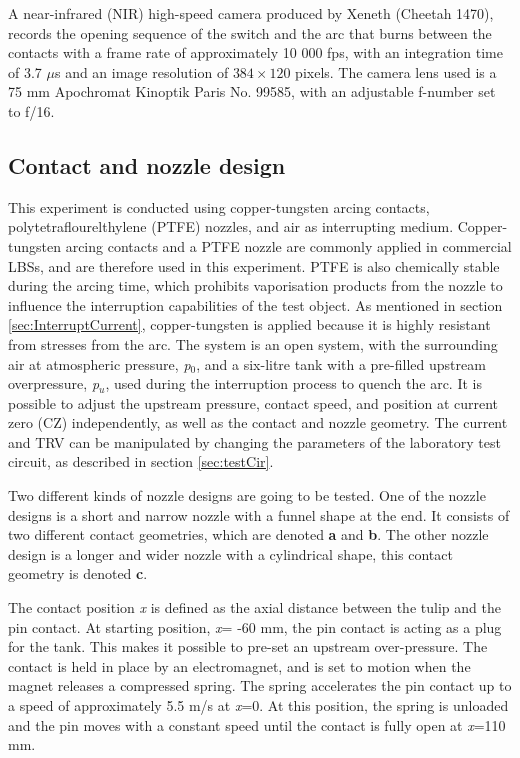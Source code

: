 \documentclass[10pt,b5paper,twoside]{article}
\begin{document}
A near-infrared (NIR) high-speed camera produced by Xeneth (Cheetah 1470), records the opening sequence of the switch and the arc that burns between the contacts with a frame rate of approximately 10 000 fps, with an integration time of 3.7 $\mu$s and an image resolution of $384 \times 120$ pixels. The camera lens used is a 75 mm Apochromat Kinoptik Paris No. 99585, with an adjustable f-number set to f/16.

\subsection{Contact and nozzle design} \label{sec:testSwitchandContact}
This experiment is conducted using copper-tungsten arcing contacts, polytetraflourelthylene (PTFE) nozzles, and air as interrupting medium. Copper-tungsten arcing contacts and a PTFE nozzle are commonly applied in commercial LBSs, and are therefore used in this experiment. PTFE is also chemically stable during the arcing time, which prohibits vaporisation products from the nozzle to influence the interruption capabilities of the test object. As mentioned in section \ref{sec:InterruptCurrent}, copper-tungsten is applied because it is highly resistant from stresses from the arc. The system is an open system, with the surrounding air at atmospheric pressure, \textit{p$_0$}, and a six-litre tank with a pre-filled upstream overpressure, \textit{p$_u$}, used during the interruption process to quench the arc. It is possible to adjust the upstream pressure, contact speed, and position at current zero (CZ) independently, as well as the contact and nozzle geometry. The current and TRV can be manipulated by changing the parameters of the laboratory test circuit, as described in section \ref{sec:testCir}.

Two different kinds of nozzle designs are going to be tested. One of the nozzle designs is a short and narrow nozzle with a funnel shape at the end. It consists of two different contact geometries, which are denoted \textbf{a} and \textbf{b}. The other nozzle design is a longer and wider nozzle with a cylindrical shape, this contact geometry is denoted \textbf{c}. 

The contact position \textit{x} is defined as the axial distance between the tulip and the pin contact. At starting position, \textit{x}= -60 mm, the pin contact is acting as a plug for the tank. This makes it possible to pre-set an upstream over-pressure. The contact is held in place by an electromagnet, and is set to motion when the magnet releases a compressed spring. The spring accelerates the pin contact up to a speed of approximately 5.5 m/s at \textit{x}=0. At this position, the spring is unloaded and the pin moves with a constant speed until the contact is fully open at \textit{x}=110 mm.
\end{document}
